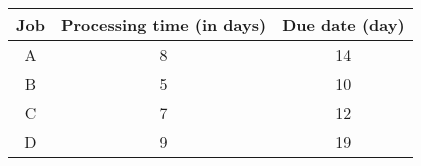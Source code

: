 \begin{center}
\begin{tabular}{|c|c|c|}
\hline
\textbf{Job} & \textbf{Processing time (in days)} & \textbf{Due date (day)} \\
\hline
A & 8 & 14 \\
B & 5 & 10 \\
C & 7 & 12 \\
D & 9 & 19 \\
\hline
\end{tabular}
\end{center}
